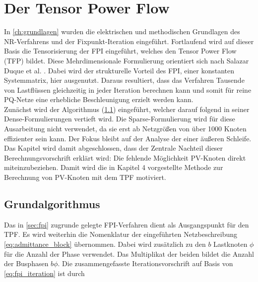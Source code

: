 \chapter{Der Tensor Power Flow}
\label{ch:tpf}

In \cref{ch:grundlagen} wurden die elektrischen und methodischen Grundlagen des NR-Verfahrens und der Fixpunkt-Iteration eingeführt. 
Fortlaufend wird auf dieser Basis die Tensorisierung der FPI eingeführt, welches den Tensor Power Flow (TFP) bildet.
Diese Mehrdimensionale Formulierung orientiert sich nach Salazar Duque et al. \cite{Salazar2024}.
Dabei wird der strukturelle Vorteil des FPI, einer konstanten Systemmatrix, hier ausgenutzt.
Daraus resultiert, dass das Verfahren Tausende von Lastflüssen gleichzeitig in jeder Iteration berechnen kann und somit für reine PQ-Netze eine erhebliche Beschleunigung erzielt werden kann.\\

Zunächst wird der Algorithmus (\cref{sec:tpf_algorithmus}) eingeführt, welcher darauf folgend in seiner Dense-Formulierungen vertieft wird. 
Die Sparse-Formulierung wird für diese Ausarbeitung nicht verwendet, da sie erst ab Netzgrößen von über 1000 Knoten effizienter sein kann.
Der Fokus bleibt auf der Analyse der einer äußeren Schleife.
Das Kapitel wird damit abgeschlossen, dass der Zentrale Nachteil dieser Berechnungsvorschrift erklärt wird: Die fehlende Möglichkeit PV-Knoten direkt miteinzubeziehen. 
Damit wird die in Kapitel 4 vorgestellte Methode zur Berechnung von PV-Knoten mit dem TPF motiviert.

\section{Grundalgorithmus}
\label{sec:tpf_algorithmus}

Das in \cref{sec:fpi} zugrunde gelegte FPI-Verfahren dient als Ausgangspunkt für den TPF. 
Es wird weiterhin die Nomenklatur der eingeführten Netzbeschreibung \eqref{eq:admittance_block} übernommen.
Dabei wird zusätzlich zu den $b$ Lastknoten $\phi$ für die Anzahl der Phase verwendet.
Das Multiplikat der beiden bildet die Anzahl der Busphasen $b\phi$. 
Die zusammengefasste Iterationsvorschrift auf Basis von \eqref{eq:fpi_iteration} ist durch


